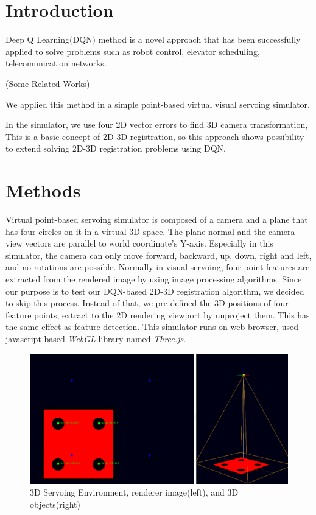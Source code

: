 \documentclass[10pt]{article}
\begin{document}
\section{Introduction}

 Deep Q Learning(DQN) method is a novel approach that has been successfully applied to solve problems such as robot control, elevator scheduling, telecomunication networks.

 (Some Related Works)

 We applied this method in a simple point-based virtual visual servoing simulator.

 In the simulator, we use four 2D vector errors to find 3D camera transformation, This is a basic concept of 2D-3D registration, so this approach shows possibility to extend solving 2D-3D registration problems using DQN.


\section{Methods}
Virtual point-based servoing simulator is composed of a camera and a plane that has four circles on it in a virtual 3D space. The plane normal and the camera view vectors are parallel to world coordinate's Y-axis. Especially in this simulator, the camera can only move forward, backward, up, down, right and left, and no rotations are possible. Normally in visual servoing, four point features are extracted from the rendered image by using image processing algorithms. Since our purpose is to test our DQN-based 2D-3D registration algorithm, we decided to skip this process. Instead of that, we pre-defined the 3D positions of four feature points, extract to the 2D rendering viewport by unproject them. This has the same effect as feature detection. This simulator runs on web browser, used javascript-based \emph{WebGL} library named \emph{Three.js}.

\begin{figure}[htb]
\begin{center}
\includegraphics[width=0.8\columnwidth]{images/fig-temp1.png}
\caption{3D Servoing Environment, renderer image(left), and 3D objects(right)}
\label{fig1}
\end{center}
\end{figure}
\end{document}
